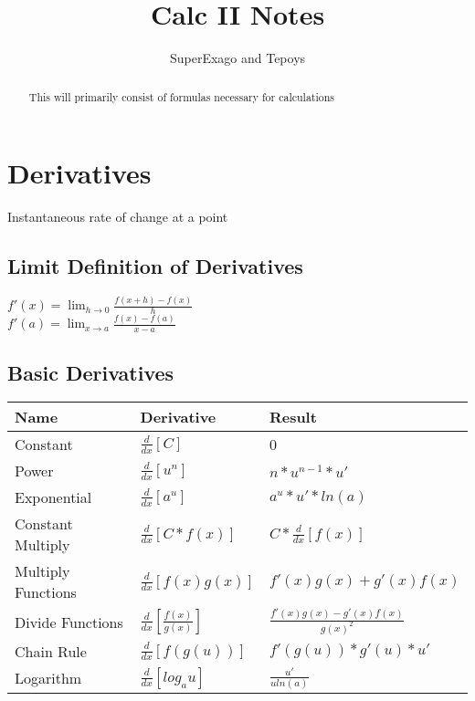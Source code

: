 \documentclass[17pt]{extarticle}
\title{Calc II Notes}
\author{SuperExago and Tepoys}
\begin{document}
\maketitle

\begin{abstract}
This will primarily consist of formulas necessary for calculations
\end{abstract}
\clearpage
\section{Derivatives}
Instantaneous rate of change at a point
\subsection{Limit Definition of Derivatives}
$f\prime(x)=\lim_{h \to 0}{\frac{f(x+h)-f(x)}{h}}$\\
$f\prime(a)=\lim_{x \to a}{\frac{f(x)-f(a)}{x-a}}$

\subsection{Basic Derivatives}
\renewcommand{\arraystretch}{2}
\begin{table}[H]
\begin{tabular}{|l|l|l|}
\hline
\rowcolor{githublightgray}
Name & Derivative & Result\\

\hline
Constant&$\frac{d}{dx}[C]$&0\\
\hline
Power&$\frac{d}{dx}[u^n]$&$n*u^{n-1}*u\prime$\\
\hline
Exponential&$\frac{d}{dx}[a^u]$&$a^u*u\prime *ln(a)$\\
\hline
Constant Multiply&$\frac{d}{dx}[C*f(x)]$&$C*\frac{d}{dx}[f(x)]$\\
\hline
Multiply Functions&$\frac{d}{dx}[f(x)g(x)]$&$f\prime(x)g(x)+g\prime(x)f(x)$\\
\hline
Divide Functions&$\frac{d}{dx}[\frac{f(x)}{g(x)}]$&$\frac{f\prime(x)g(x)-g\prime(x)f(x)}{g(x)^2}$\\
\hline
Chain Rule&$\frac{d}{dx}[f(g(u))]$&$f\prime(g(u))*g\prime(u)*u\prime$\\
\hline
Logarithm&$\frac{d}{dx}[log_au]$&$\frac{u\prime}{uln(a)}$\\
\hline
\end{tabular}
\end{table}
\end{document}
